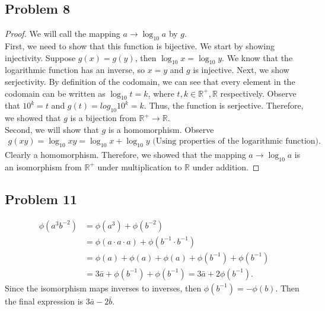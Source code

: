 \documentclass[a4paper,12pt]{article}
\begin{document}
\subsection*{Problem 8}
\begin{proof}
    We will call the mapping $a\to \log_{10}{a}$ by $g$. \\
    First, we need to show that this function is bijective. We start by showing injectivity. Suppose $g(x)=g(y)$, then $\log_{10}x=\log_{10}y$. We know that the logarithmic function has an inverse, so $x=y$ and $g$ is injective. Next, we show serjectivity. By definition of the codomain, we can see that every element in the codomain can be written as $\log_{10}t=k$, where $t,k\in \mathbb{R^+}, \mathbb{R}$ respectively. Observe that $10^k=t$ and $g(t)=log_{10}{10^k}=k.$ Thus, the function is serjective. Therefore, we showed that $g$ is a bijection from $\mathbb{R^+}\to \mathbb{R}.$
\\  Second, we will show that $g$ is a homomorphism. Observe
\begin{align*}
    g(xy)=\log_{10}{xy}=\log_{10}{x}+\log_{10}{y} \text{  (Using properties of the logarithmic function).}
\end{align*}
Clearly a homomorphism. Therefore, we showed that the mapping $a\to \log_{10}{a}$ is an isomorphism from $\mathbb{R^+}$ under multiplication to $\mathbb{R}$ under addition.
\end{proof}
\subsection*{Problem 11}
\begin{align*}
    \phi(a^3b^{-2})&=\phi(a^3)+\phi(b^{-2})\\
    &=\phi(a \cdot a \cdot a)+\phi(b^{-1}\cdot b^{-1})\\
    &=\phi(a)+\phi(a)+\phi(a)+\phi(b^{-1})+\phi(b^{-1})\\
    &=3\bar{a}+\phi(b^{-1})+\phi(b^{-1})=3\bar{a}+2\phi(b^{-1}).
\end{align*}
Since the isomorphism maps inverses to inverses, then $\phi(b^{-1})=-\phi(b).$
Then the final expression is $3\bar{a}-2\bar{b}.$ 
\end{document}
